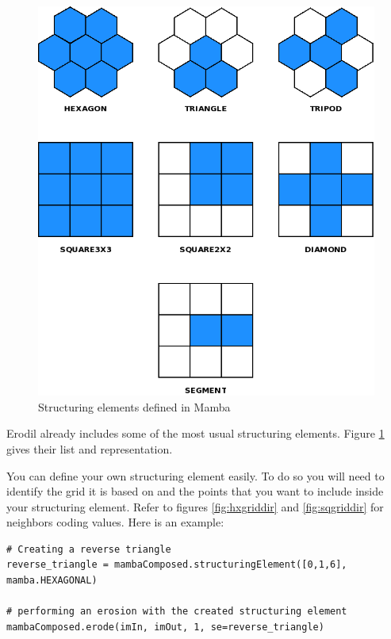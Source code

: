 \documentclass[a4paper,10pt,oneside]{article}
\begin{document}
\begin{figure}
\centering
\includegraphics[scale=0.3]{se.png}
\caption{Structuring elements defined in Mamba}
\label{fig:se}
\end{figure}

Erodil already includes some of the most usual structuring elements. Figure
\ref{fig:se} gives their list and representation.

You can define your own structuring element easily. To do so you will need to
identify the grid it is based on and the points that you want to include 
inside your structuring element. Refer to figures \ref{fig:hxgriddir} and 
\ref{fig:sqgriddir} for neighbors coding values. Here is an example:

\lstset{language=Python}
\begin{lstlisting}
# Creating a reverse triangle
reverse_triangle = mambaComposed.structuringElement([0,1,6], mamba.HEXAGONAL)

# performing an erosion with the created structuring element
mambaComposed.erode(imIn, imOut, 1, se=reverse_triangle)
\end{lstlisting}
\end{document}
